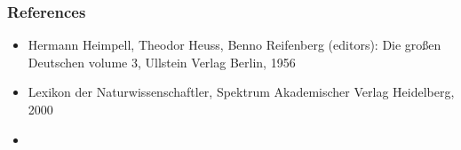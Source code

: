 \documentclass[12pt]{article}
\begin{document}
\subsubsection*{References}
\begin{itemize}
\item Hermann Heimpell, Theodor Heuss, Benno Reifenberg (editors): Die gro\ss en Deutschen volume 3, Ullstein Verlag Berlin, 1956
\item Lexikon der Naturwissenschaftler, Spektrum Akademischer Verlag Heidelberg, 2000
\item {}
\end{itemize}
\end{document}
